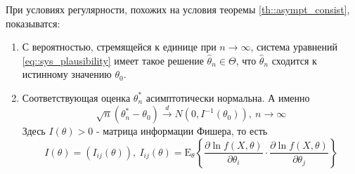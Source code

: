 \documentclass[12pt]{article}
\theoremstyle{basic_theorem}
\theoremstyle{name_theorem}
\def\E{ \mathrm{E} }
\begin{document}
    При условиях регулярности, похожих на условия теоремы \ref{th::asympt_consist},
    показыватся:
    \begin{enumerate}
        \item С вероятностью, стремящейся к единице при \(n \rightarrow \infty\),
            система уравнений \eqref{eq::sys_plausibility} имеет такое решение \(\widehat{\theta}_n\in\Theta\),
            что \(\widehat{\theta}_n\) сходится к истинному значению \(\theta_0\).
        \item Соответствующая оценка \(\theta^*_n\) асимптотически нормальна. А именно
         \[\sqrt{n}(\theta^*_n - \theta_0) \xrightarrow{d} N(0, I^{-1}(\theta_0)),\ n\rightarrow\infty\]
         Здесь \(I(\theta) > 0\) - матрица информации Фишера, то есть
         \[I(\theta) = (I_{ij}(\theta)),\ I_{ij}(\theta) = \E_\theta \left\{\frac{\partial \ln f(X, \theta)}{\partial\theta_i} \cdot \frac{\partial\ln f(X, \theta)}{\partial\theta_j}\right\}\]
    \end{enumerate}
\end{document}

